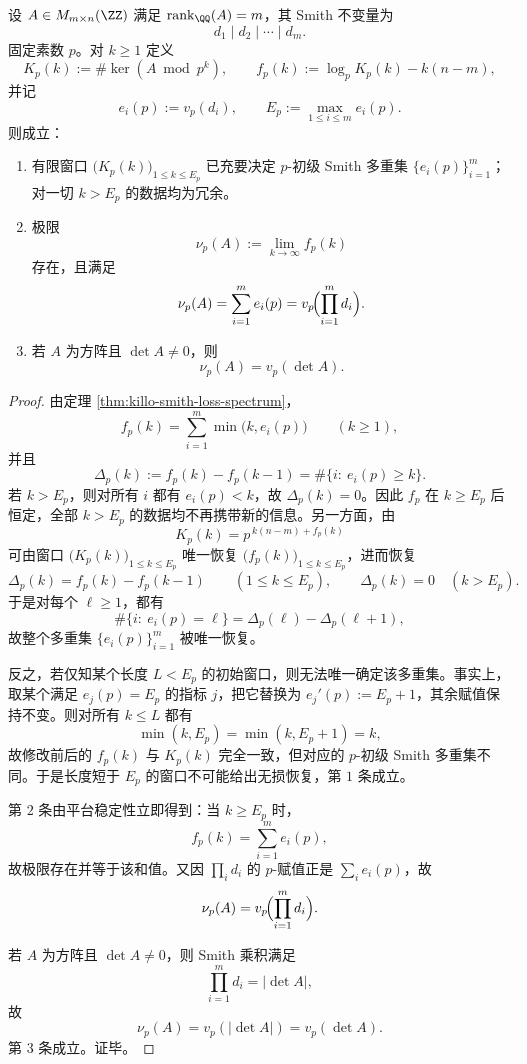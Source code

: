 \begin{theorem}\label{thm:xi-smith-finite-pwindow-complete-recovery-determinant-index}
设 \(A\in M_{m\times n}(\ZZ)\) 满足 \(\operatorname{rank}_{\QQ}(A)=m\)，其 Smith 不变量为
\[
d_1\mid d_2\mid\cdots\mid d_m.
\]
固定素数 \(p\)。对 \(k\ge 1\) 定义
\[
K_p(k):=\#\ker(A\bmod p^k),
\qquad
f_p(k):=\log_p K_p(k)-k(n-m),
\]
并记
\[
e_i(p):=v_p(d_i),
\qquad
E_p:=\max_{1\le i\le m}e_i(p).
\]
则成立：
\begin{enumerate}
  \item 有限窗口 \(\bigl(K_p(k)\bigr)_{1\le k\le E_p}\) 已充要决定 \(p\)-初级 Smith 多重集 \(\{e_i(p)\}_{i=1}^{m}\)；对一切 \(k>E_p\) 的数据均为冗余。
  \item 极限
  \[
  \nu_p(A):=\lim_{k\to\infty}f_p(k)
  \]
  存在，且满足
  \[
  \nu_p(A)
  =
  \sum_{i=1}^{m}e_i(p)
  =
  v_p\!\Bigl(\prod_{i=1}^{m}d_i\Bigr).
  \]
  \item 若 \(A\) 为方阵且 \(\det A\neq 0\)，则
  \[
  \nu_p(A)=v_p(\det A).
  \]
\end{enumerate}
\end{theorem}
\begin{proof}
由定理 \ref{thm:killo-smith-loss-spectrum}，
\[
f_p(k)=\sum_{i=1}^{m}\min\bigl(k,e_i(p)\bigr)
\qquad(k\ge 1),
\]
并且
\[
\Delta_p(k):=f_p(k)-f_p(k-1)=\#\{i:\ e_i(p)\ge k\}.
\]
若 \(k>E_p\)，则对所有 \(i\) 都有 \(e_i(p)<k\)，故 \(\Delta_p(k)=0\)。因此 \(f_p\) 在 \(k\ge E_p\) 后恒定，全部 \(k>E_p\) 的数据均不再携带新的信息。另一方面，由
\[
K_p(k)=p^{\,k(n-m)+f_p(k)}
\]
可由窗口 \(\bigl(K_p(k)\bigr)_{1\le k\le E_p}\) 唯一恢复 \(\bigl(f_p(k)\bigr)_{1\le k\le E_p}\)，进而恢复
\[
\Delta_p(k)=f_p(k)-f_p(k-1)
\qquad(1\le k\le E_p),
\qquad
\Delta_p(k)=0
\quad(k>E_p).
\]
于是对每个 \(\ell\ge 1\)，都有
\[
\#\{i:\ e_i(p)=\ell\}
=
\Delta_p(\ell)-\Delta_p(\ell+1),
\]
故整个多重集 \(\{e_i(p)\}_{i=1}^{m}\) 被唯一恢复。

反之，若仅知某个长度 \(L<E_p\) 的初始窗口，则无法唯一确定该多重集。事实上，取某个满足 \(e_j(p)=E_p\) 的指标 \(j\)，把它替换为 \(e_j'(p):=E_p+1\)，其余赋值保持不变。则对所有 \(k\le L\) 都有
\[
\min(k,E_p)=\min(k,E_p+1)=k,
\]
故修改前后的 \(f_p(k)\) 与 \(K_p(k)\) 完全一致，但对应的 \(p\)-初级 Smith 多重集不同。于是长度短于 \(E_p\) 的窗口不可能给出无损恢复，第 \(1\) 条成立。

第 \(2\) 条由平台稳定性立即得到：当 \(k\ge E_p\) 时，
\[
f_p(k)=\sum_{i=1}^{m}e_i(p),
\]
故极限存在并等于该和值。又因 \(\prod_i d_i\) 的 \(p\)-赋值正是 \(\sum_i e_i(p)\)，故
\[
\nu_p(A)=v_p\!\Bigl(\prod_{i=1}^{m}d_i\Bigr).
\]

若 \(A\) 为方阵且 \(\det A\neq 0\)，则 Smith 乘积满足
\[
\prod_{i=1}^{m}d_i=|\det A|,
\]
故
\[
\nu_p(A)=v_p(|\det A|)=v_p(\det A).
\]
第 \(3\) 条成立。证毕。
\end{proof}

\endinput
